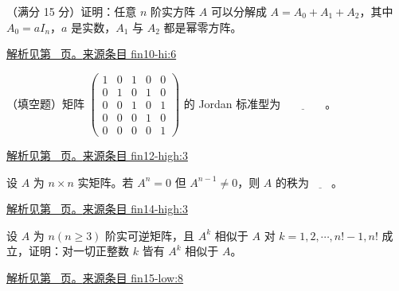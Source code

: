 \documentclass[UTF8,12pt,a4paper,fontset=fandol]{ctexart}
\begin{document}
\begin{example}\label{ex:fin10-hi:6}

（满分 15 分）证明：任意 $n$ 阶实方阵 $A$ 可以分解成 $A = A_{0} + A_{1} + A_{2}$，其中 $A_{0} = aI_{n}$，$a$ 是实数，$A_{1}$ 与 $A_{2}$ 都是幂零方阵。

\par\hyperref[ans:fin10-hi:6]{解析见第~\pageref{ans:fin10-hi:6} 页。}\quad\href{https://github.com/lzxcr/cmc-mathematics/blob/64916fa1fdbc3e444a652eca204d5669058ee321/src/problems/finals/10/06.md}{来源条目 fin10-hi:6}

\end{example}

\begin{example}\label{ex:fin12-high:3}

（填空题）矩阵 $\begin{pmatrix} 1 & 0 & 1 & 0 & 0 \\ 0 & 1 & 0 & 1 & 0 \\ 0 & 0 & 1 & 0 & 1 \\ 0 & 0 & 0 & 1 & 0 \\ 0 & 0 & 0 & 0 & 1 \end{pmatrix}$ 的 Jordan 标准型为$\underline{\qquad\qquad}$。

\par\hyperref[ans:fin12-high:3]{解析见第~\pageref{ans:fin12-high:3} 页。}\quad\href{https://github.com/lzxcr/cmc-mathematics/blob/64916fa1fdbc3e444a652eca204d5669058ee321/src/problems/finals/12/03.md}{来源条目 fin12-high:3}

\end{example}

\begin{example}\label{ex:fin14-high:3}

设 $A$ 为 $n \times n$ 实矩阵。若 $A^n=0$ 但 $A^{n-1} \neq 0$，则 $A$ 的秩为$\underline{\qquad}$。

\par\hyperref[ans:fin14-high:3]{解析见第~\pageref{ans:fin14-high:3} 页。}\quad\href{https://github.com/lzxcr/cmc-mathematics/blob/64916fa1fdbc3e444a652eca204d5669058ee321/src/problems/finals/14/03.md}{来源条目 fin14-high:3}

\end{example}

\begin{example}\label{ex:fin15-low:8}

设 $A$ 为 $n(n \geq 3)$ 阶实可逆矩阵，且 $A^{k}$ 相似于 $A$ 对 $k = 1,2,\cdots,n!-1,n!$ 成立，证明：对一切正整数 $k$ 皆有 $A^{k}$ 相似于 $A$。

\par\hyperref[ans:fin15-low:8]{解析见第~\pageref{ans:fin15-low:8} 页。}\quad\href{https://github.com/lzxcr/cmc-mathematics/blob/64916fa1fdbc3e444a652eca204d5669058ee321/src/problems/finals/15/08.md}{来源条目 fin15-low:8}

\end{example}
\end{document}

